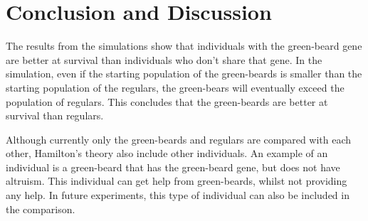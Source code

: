 \documentclass[conference]{IEEEtran}
\begin{document}
	\section{Conclusion and Discussion}
	The results from the simulations show that individuals with the green-beard gene are better at survival than individuals who don't share that gene. In the simulation, even if the starting population of the green-beards is smaller than the starting population of the regulars, the green-bears will eventually exceed the population of regulars. This concludes that the green-beards are better at survival than regulars.
	
	Although currently only the green-beards and regulars are compared with each other, Hamilton's theory also include other individuals. An example of an individual is a green-beard that has the green-beard gene, but does not have altruism. This individual can get help from green-beards, whilst not providing any help. In future experiments, this type of individual can also be included in the comparison.
	



	
\end{document}
